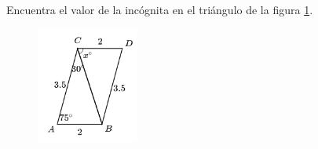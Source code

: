 \question[10]  Encuentra el valor de la incógnita en el triángulo de la figura \ref{fig:angle_triangle_18}.
\begin{figure}[H]
    \begin{center}
        \includegraphics[width=0.3\textwidth]{../images/angle_triangle_18.png}
    \end{center}
    \caption{}
    \label{fig:angle_triangle_18}
\end{figure}